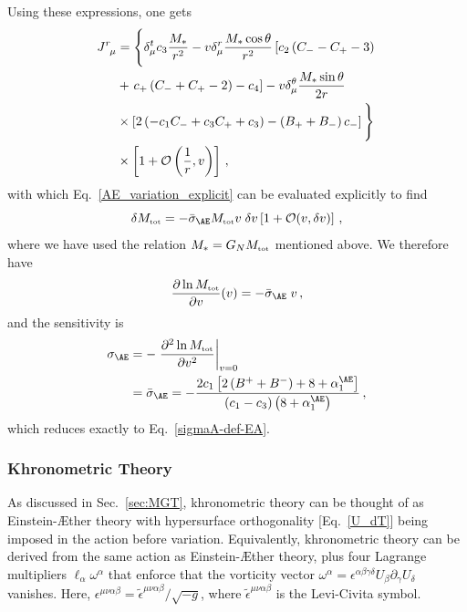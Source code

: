 \documentclass[prd,aps,twocolumn,nofootinbib,showpacs,superscriptaddress]{revtex4-1}
\newcommand\be{\begin{equation}}
\newcommand\ee{\end{equation}}
\newcommand{\nn}{\nonumber}
\newcommand{\tot}{{\mbox{\tiny tot}}}
\begin{document}
Using these expressions, one gets
\begin{align}
J^{r}_{\phantom{a}\mu} &=\Bigg\{\delta_\mu^t c_3 \frac{M_*}{r^2} -v
\delta_\mu^r \frac{M_* \cos \theta}{r^{2}} \left[c_2 \left(C_- - C_+ - 3\right)
\right.  
\nn \\
&+ \left. 
c_+ \left(C_-+C_+-2\right)-c_4\right] - v \delta_\mu^\theta \frac{M_* \sin \theta}{2r} 
\nn \\
&\times 
\left[2 \left(-c_1 C_-+c_3 C_++c_3\right)-\left(B_++B_-\right) c_-\right] \Bigg\}
\nn \\
&\times
\left[1+{\cal{O}}\left(\frac1r,v\right)\right]\,,
\end{align}
with which Eq.~\eqref{AE_variation_explicit} can be evaluated explicitly to find
%
\be \delta M_{\tot} = -\bar{\sigma}_{\AE} M_{\tot} v \; \delta v  \left[1 +{\cal O}(v,\delta
  v)\right] \,, \ee
%
where we have used the relation $M_*=G_N M_{\tot}$ mentioned above.
%
We therefore have
%
\be \frac{\partial \ln M_{\tot}}{\partial {v}} ({v})= -\bar{\sigma}_{\AE} \; v \,, \ee
%
and the sensitivity is
\begin{align}
\label{sigmaA-def-EA2}
\sigma_{\AE} &=-  \left.\frac{\partial^2 \ln M_{\tot}}{\partial  {v}^2}\right|_{v=0} \nn \\
 &= \bar{\sigma}_{\AE} 
 = -\frac{2 c_{1} \left[2\left(B^{+} + B^{-}\right) + 8 + \alpha^{\AE}_{1} \right]}{\left(c_{1} - c_{3}\right) \left(8 + \alpha^{\AE}_{1}\right)}\,, 
\end{align}
%
which reduces exactly to Eq.~\eqref{sigmaA-def-EA}.  

\subsubsection{Khronometric Theory}

As discussed in Sec.~\ref{sec:MGT}, khronometric theory can be thought of as
Einstein-\AE ther theory with hypersurface orthogonality [Eq.~\eqref{U_dT}]
being imposed in the action before variation.
Equivalently, khronometric theory can be derived from the same action as
Einstein-\AE ther theory, plus four Lagrange multipliers $\ell_\alpha
\omega^\alpha$ that enforce that the vorticity vector $\omega^\alpha=
\epsilon^{\alpha\beta\gamma\delta} U_\beta \partial_\gamma U_\delta$
vanishes. Here, $\epsilon^{\mu\nu\alpha\beta}=\tilde{\epsilon}^{\mu\nu\alpha\beta}/\sqrt{-g}$, where 
$\tilde{\epsilon}^{\mu\nu\alpha\beta}$ is the Levi-Civita symbol.
\end{document}
